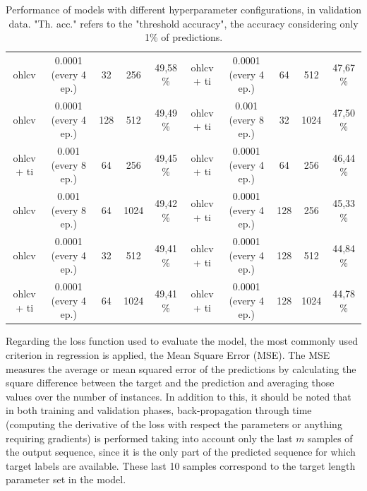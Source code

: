 \documentclass[10pt,twocolumn,letterpaper]{article}
\begin{document}
\begin{table}
\begin{center}
\begin{tabular}{ccccc|ccccc}
    ohlcv & 0.0001 (every 4 ep.) & 32 & 256 & 49,58 \% & ohlcv + ti & 0.0001 (every 4 ep.) & 64 & 512 & 47,67 \% \\
    ohlcv & 0.0001 (every 4 ep.) & 128 & 512 & 49,49 \% & ohlcv + ti & 0.001 (every 8 ep.) & 32 & 1024 & 47,50 \% \\
    ohlcv + ti & 0.001 (every 8 ep.) & 64 & 256 & 49,45 \% & ohlcv + ti & 0.0001 (every 4 ep.) & 64 & 256 & 46,44 \% \\
    ohlcv & 0.001 (every 8 ep.) & 64 & 1024 & 49,42 \% & ohlcv + ti & 0.0001 (every 4 ep.) & 128 & 256 & 45,33 \% \\
    ohlcv & 0.0001 (every 4 ep.) & 32 & 512 & 49,41 \% & ohlcv + ti & 0.0001 (every 4 ep.) & 128 & 512 & 44,84 \% \\
    ohlcv + ti & 0.0001 (every 4 ep.) & 64 & 1024 & 49,41 \% & ohlcv + ti & 0.0001 (every 4 ep.) & 128 & 1024 & 44,78 \% \\
    \bottomrule
    \end{tabular}
\end{center}
   \caption{Performance of models with different hyperparameter configurations, in validation data. "Th. acc." refers to the "threshold accuracy", \ie the accuracy considering only 1\% of predictions.}
   \label{all_models}
\end{table}

Regarding the loss function used to evaluate the model, the most commonly used criterion in regression is applied, the Mean Square Error (MSE). The MSE measures the average or mean squared error of the predictions by calculating the square difference between the target and the prediction and averaging those values over the number of instances. In addition to this, it should be noted that in both training and validation phases, back-propagation through time (computing the derivative of the loss with respect the parameters or anything requiring gradients) is performed taking into account only the last $m$ samples of the output sequence, since it is the only part of the predicted sequence for which target labels are available. These last 10 samples correspond to the target length parameter set in the model.
\end{document}
